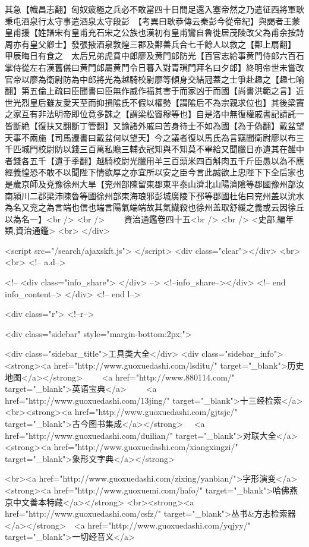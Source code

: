 其急【幟昌志翻】匈奴疲極之兵必不敢當四十日間足還入塞帝然之乃遣征西將軍耿秉屯酒泉行太守事遣酒泉太守段彭　【考異曰耿恭傳云秦彭今從帝紀】與謁者王蒙皇甫援【姓譜宋有皇甫充石宋之公族也漢初有皇甫鸞自魯徙居茂陵改父為甫余按詩周亦有皇父卿士】發張掖酒泉敦煌三郡及鄯善兵合七千餘人以救之【鄯上扇翻】　甲辰晦日有食之　太后兄弟虎賁中郎廖及黄門郎防光【百官志給事黄門侍郎六百石掌侍從左右漢舊儀曰黄門郎屬黄門令日暮入對青瑣門拜名曰夕郎】終明帝世未嘗改官帝以廖為衛尉防為中郎將光為越騎校尉廖等傾身交結冠蓋之士爭赴趣之【趣七喻翻】第五倫上疏曰臣聞書曰臣無作威作福其害于而家凶于而國【尚書洪範之言】近世光烈皇后雖友愛天至而抑損隂氏不假以權勢【謂隂后不為宗親求位也】其後梁竇之家互有非法明帝即位竟多誅之【謂梁松竇穆等也】自是洛中無復權戚書記請託一皆斷絶【復扶又翻斷丁管翻】又諭諸外戚曰苦身待士不如為國【為于偽翻】戴盆望天事不兩施【司馬遷書曰戴盆何以望天】今之議者復以馬氏為言竊聞衛尉廖以布三千匹城門校尉防以錢三百萬私贍三輔衣冠知與不知莫不畢給又聞臘日亦遺其在雒中者錢各五千【遺于季翻】越騎校尉光臘用羊三百頭米四百斛肉五千斤臣愚以為不應經義惶恐不敢不以聞陛下情欲厚之亦宜所以安之臣今言此誠欲上忠陛下下全后家也　是歲京師及兗豫徐州大旱【兖州部陳留東郡東平泰山濟北山陽濟隂等郡國豫州部汝南潁川二郡梁沛陳魯等國徐州部東海琅邪彭城廣陵下邳等郡國杜佑曰兖州盖以沇水為名又兖之為言端也信也端言陽氣端端故其氣纎殺也徐州盖取舒緩之義或云因徐丘以為名一】<br />
<br />
　　資治通鑑卷四十五<br />
<br />
<史部,編年類,資治通鑑>  <br>
   </div> 

<script src="/search/ajaxskft.js"> </script>
 <div class="clear"></div>
<br>
<br>
 <!-- a.d-->

 <!--
<div class="info_share">
</div> 
-->
 <!--info_share--></div>   <!-- end info_content-->
  </div> <!-- end l-->

<div class="r">   <!--r-->



<div class="sidebar"  style="margin-bottom:2px;">

 
<div class="sidebar_title">工具类大全</div>
<div class="sidebar_info">
<strong><a href="http://www.guoxuedashi.com/lsditu/" target="_blank">历史地图</a></strong>　　
<a href="http://www.880114.com/" target="_blank">英语宝典</a>　　
<a href="http://www.guoxuedashi.com/13jing/" target="_blank">十三经检索</a>　
<br><strong><a href="http://www.guoxuedashi.com/gjtsjc/" target="_blank">古今图书集成</a></strong>　
<a href="http://www.guoxuedashi.com/duilian/" target="_blank">对联大全</a>　<strong><a href="http://www.guoxuedashi.com/xiangxingzi/" target="_blank">象形文字典</a></strong>　

<br><a href="http://www.guoxuedashi.com/zixing/yanbian/">字形演变</a>　　<strong><a href="http://www.guoxuemi.com/hafo/" target="_blank">哈佛燕京中文善本特藏</a></strong>
<br><strong><a href="http://www.guoxuedashi.com/csfz/" target="_blank">丛书&方志检索器</a></strong>　<a href="http://www.guoxuedashi.com/yqjyy/" target="_blank">一切经音义</a>　　


